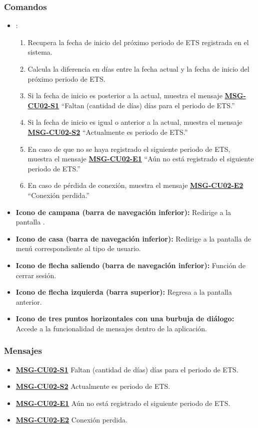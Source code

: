 \subsubsection{Comandos}
\begin{itemize}
	\item {}:
	\begin{enumerate}
		\item Recupera la fecha de inicio del próximo periodo de ETS registrada en el sistema.
		\item Calcula la diferencia en días entre la fecha actual y la fecha de inicio del próximo periodo de ETS.
		\item Si la fecha de inicio es posterior a la actual, muestra el mensaje \textbf{\hyperref[msg:CU02-S1]{MSG-CU02-S1}} ``Faltan (cantidad de días) días para el periodo de ETS.''
		\item Si la fecha de inicio es igual o anterior a la actual, muestra el mensaje \textbf{\hyperref[msg:CU02-S2]{MSG-CU02-S2}} ``Actualmente es periodo de ETS.''
		\item En caso de que no se haya registrado el siguiente periodo de ETS, muestra el mensaje \textbf{\hyperref[msg:CU02-E1]{MSG-CU02-E1}} ``Aún no está registrado el siguiente periodo de ETS.''
		\item En caso de pérdida de conexión, muestra el mensaje \textbf{\hyperref[msg:CU02-E2]{MSG-CU02-E2}} ``Conexión perdida.''
	\end{enumerate}
	\item \textbf{Icono de campana (barra de navegación inferior):} Redirige a la pantalla .
	\item \textbf{Icono de casa (barra de navegación inferior):} Redirige a la pantalla de menú correspondiente al tipo de usuario.
	\item \textbf{Icono de flecha saliendo (barra de navegación inferior):} Función de cerrar sesión.
	\item \textbf{Icono de flecha izquierda (barra superior):} Regresa a la pantalla anterior.
	\item \textbf{Icono de tres puntos horizontales con una burbuja de diálogo:} Accede a la funcionalidad de mensajes dentro de la aplicación.
\end{itemize}

\subsubsection{Mensajes}

\begin{itemize}
	\item \textbf{\hyperref[msg:CU02-S1]{MSG-CU02-S1}} Faltan (cantidad de días) días para el periodo de ETS.
	\item \textbf{\hyperref[msg:CU02-S2]{MSG-CU02-S2}} Actualmente es periodo de ETS.
	\item \textbf{\hyperref[msg:CU02-E1]{MSG-CU02-E1}} Aún no está registrado el siguiente periodo de ETS.
	\item \textbf{\hyperref[msg:CU02-E2]{MSG-CU02-E2}} Conexión perdida.
\end{itemize}


